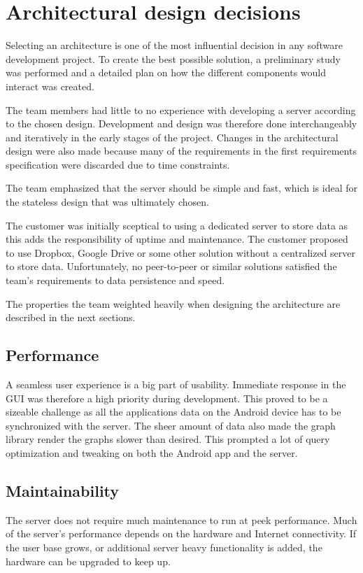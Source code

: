 \section{Architectural design decisions}
\label{sec:arch_design}
Selecting an architecture is one of the most influential decision in any software development project. To create the best possible solution, a preliminary study was performed and a detailed plan on how the different components would interact was created. 

The team members had little to no experience with developing a server according to the chosen design. Development and design was therefore done interchangeably and iteratively in the early stages of the project. Changes in the architectural design were also made because many of the requirements in the first requirements specification were discarded due to time constraints.

The team emphasized that the server should be simple and fast, which is ideal for the stateless design that was ultimately chosen. 

The customer was initially sceptical to using a dedicated server to store data as this adds the responsibility of uptime and maintenance. The customer proposed to use Dropbox, Google Drive or some other solution without a centralized server to store data. Unfortunately, no peer-to-peer or similar solutions satisfied the team's requirements to data persistence and speed.

The properties the team weighted heavily when designing the architecture are described in the next sections.

\subsection{Performance}
A seamless user experience is a big part of usability. Immediate response in the GUI was therefore a high priority during development. This proved to be a sizeable challenge as all the applications data on the Android device has to be synchronized with the server. 
The sheer amount of data also made the graph library render the graphs slower than desired. This prompted a lot of query optimization and tweaking on both the Android app and the server. 

\subsection{Maintainability}
The server does not require much maintenance to run at peek performance. Much of the server's performance depends on the hardware and Internet connectivity. If the user base grows, or additional server heavy functionality is added, the hardware can be upgraded to keep up.

